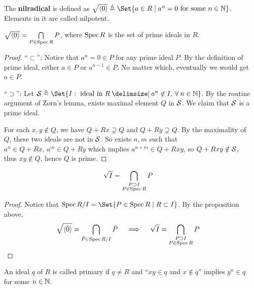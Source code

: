 \begin{definition}
  The {\bf nilradical} is defined as $\sqrt{\gen{0}} \triangleq
  \Set{ a \in R \mid a^n = 0 \text{ for some } n \in \Nb}$.
  Elements in it are called nilpotent.
\end{definition}

\begin{prop}
  $\sqrt{ \langle0\rangle } = \bigcap\limits_{P \in \operatorname{Spec} R} P$, where $\operatorname{Spec} R$ is the
  set of prime ideals in $R$.

  \begin{proof}
    ``$\subset$'': Notice that $a^n = 0 \in P$ for any prime ideal $P$. By the definition of
    prime ideal, either $a \in P$ or $a^{n-1} \in P$. No matter which, eventually we would get
    $a \in P$.

    ``$\supset$'':
    Let $\Sc \triangleq \Set{ I : \text{ ideal in } R \given a^n \notin I, \, \forall n \in \Nb}$.
    By the routine argument of Zorn's lemma, exists maximal element $Q$ in $\mathcal{S}$.
    We claim that $\mathcal{S}$ is a prime ideal.

    For each $x, y \notin Q$, we have $Q + Rx \supsetneq Q$ and $Q + Ry \supsetneq Q$.
    By the maximality of $Q$, these two ideals are not in $\mathcal{S}$.
    So exists $n, m$ such that $a^n \in Q + Rx,\, a^m \in Q + Ry$ which implies
    $a^{n+m} \in Q + Rxy$, so $Q + Rxy \notin \mathcal{S}$, thus $xy \notin Q$,
    hence $Q$ is prime.
  \end{proof}
\end{prop}

\begin{coro} \label{coro:equation-of-sqrt-ideal}
  \[ \sqrt{I} = \bigcap_{\substack{P \supset I \\ P \in \operatorname{Spec} R}} P \]

  \begin{proof}
    Notice that $\Spec \quot{R}{I} = \Set{P \in \Spec R \mid R \subset I}$.
    By the proposition above,
    \[
      \sqrt{\langle \bar0 \rangle} = \bigcap_{\bar{P} \in \operatorname{Spec} {R}/{I}} \bar{P}
      \quad \implies \quad \sqrt{I} = \bigcap_{\substack{P \supset I \\ P \in \operatorname{Spec} R}} P
      \qedhere
    \]
    \end{proof}
\end{coro}

\begin{definition}
  An ideal $q$ of $R$ is called primary if $q \neq R$ and ``$xy \in q$ and $x \notin q$''
  implies $y^n \in q$ for some $n \in \mathbb{N}$.
\end{definition}

